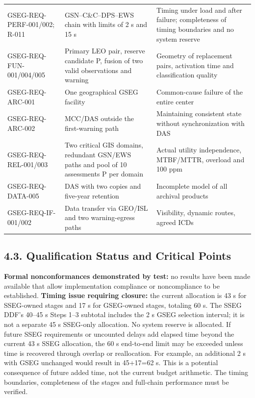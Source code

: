 \begingroup{}
\begin{longtable}{|P{0.27}|P{0.38}|P{0.35}|}
\hline{}
 &  & \\ \hline
\endhead
\hline\endlastfoot
GSEG-REQ-PERF-001/\allowbreak{}002; R-011 & GSN–C\&C–DPS–EWS chain with limits of 2 s and 15 s & Timing under load and after failure; completeness of timing boundaries and no system reserve\\ \hline
GSEG-REQ-FUN-001/\allowbreak{}004/\allowbreak{}005 & Primary LEO pair, reserve candidate P, fusion of two valid observations and warning & Geometry of replacement pairs, activation time and classification quality\\ \hline
GSEG-REQ-ARC-001 & One geographical GSEG facility & Common-cause failure of the entire center\\ \hline
GSEG-REQ-ARC-002 & MCC/\allowbreak{}DAS outside the first-warning path & Maintaining consistent state without synchronization with DAS\\ \hline
GSEG-REQ-REL-001/\allowbreak{}003 & Two critical GIS domains, redundant GSN/\allowbreak{}EWS paths and pool of 10 assessments P per domain & Actual utility independence, MTBF/\allowbreak{}MTTR, overload and 100 ppm\\ \hline
GSEG-REQ-DATA-005 & DAS with two copies and five-year retention & Incomplete model of all archival products\\ \hline
GSEG-REQ-IF-001/\allowbreak{}002 & Data transfer via GEO/\allowbreak{}ISL and two warning-egress paths & Visibility, dynamic routes, agreed ICDs\\*
\end{longtable}
\endgroup

\subsection{4.3. Qualification Status and Critical Points}\label{ddjf-4-3}

\textbf{Formal nonconformances demonstrated by test:} no results have been made available that allow implementation compliance or noncompliance to be established. \textbf{Timing issue requiring closure:} the current allocation is 43 s for SSEG-owned stages and 17 s for GSEG-owned stages, totaling 60 s. The SSEG DDF's 40--45 s Steps 1--3 subtotal includes the 2 s GSEG selection interval; it is not a separate 45 s SSEG-only allocation. No system reserve is allocated. If future SSEG requirements or uncounted delays add elapsed time beyond the current 43 s SSEG allocation, the 60 s end-to-end limit may be exceeded unless time is recovered through overlap or reallocation. For example, an additional 2 s with GSEG unchanged would result in 45+17=62 s. This is a potential consequence of future added time, not the current budget arithmetic. The timing boundaries, completeness of the stages and full-chain performance must be verified.

